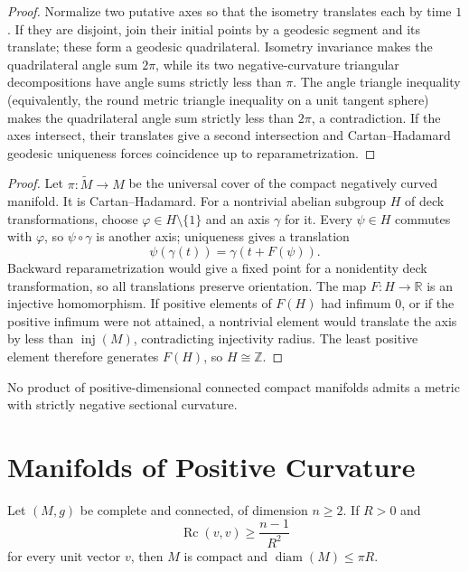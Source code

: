 \begin{proof}
\sketch
Normalize two putative axes so that the isometry translates each by time $1$.
If they are disjoint, join their initial points by a geodesic segment and its
translate; these form a geodesic quadrilateral.  Isometry invariance makes the
quadrilateral angle sum $2\pi$, while its two negative-curvature triangular
decompositions have angle sums strictly less than $\pi$.  The angle triangle
inequality (equivalently, the round metric triangle inequality on a unit
tangent sphere) makes the quadrilateral angle sum strictly less than $2\pi$,
a contradiction.  If the axes intersect, their translates give a second
intersection and Cartan--Hadamard geodesic uniqueness forces coincidence up to
reparametrization.
\end{proof}

\begin{proof}
\sketch
Let $\pi:\widetilde M\to M$ be the universal cover of the compact negatively
curved manifold.  It is Cartan--Hadamard.  For a nontrivial abelian subgroup
$H$ of deck transformations, choose $\varphi\in H\setminus\{1\}$ and an axis
$\gamma$ for it.  Every $\psi\in H$ commutes with $\varphi$, so $\psi\circ\gamma$
is another axis; uniqueness gives a translation
\[
\psi(\gamma(t))=\gamma(t+F(\psi)).
\]
Backward reparametrization would give a fixed point for a nonidentity deck
transformation, so all translations preserve orientation.  The map
$F:H\to\mathbb R$ is an injective homomorphism.  If positive elements of
$F(H)$ had infimum $0$, or if the positive infimum were not attained, a
nontrivial element would translate the axis by less than
$\operatorname{inj}(M)$, contradicting injectivity radius.  The least positive
element therefore generates $F(H)$, so $H\cong\mathbb Z$.
\end{proof}

\begin{corollary}
\label{cor:no-product-negative-sectional-curvature}
No product of positive-dimensional connected compact manifolds admits a
metric with strictly negative sectional curvature.
\end{corollary}

\section{Manifolds of Positive Curvature}

\begin{theorem}
\label{thm:myers-positive-ricci-geometric}
\leanok
Let $(M,g)$ be complete and connected, of dimension $n\geq2$.  If $R>0$ and
\[
\operatorname{Rc}(v,v)\geq\frac{n-1}{R^2}
\]
for every unit vector $v$, then $M$ is compact and
$\operatorname{diam}(M)\leq\pi R$.
\end{theorem}

